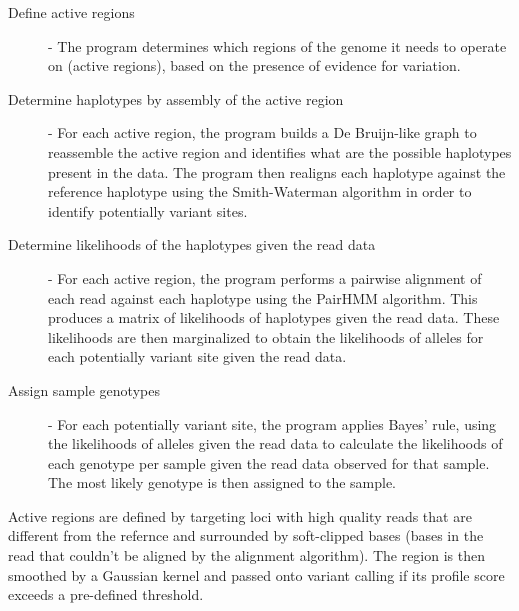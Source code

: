 \begin{description}
    \item [Define active regions] - The program determines which regions of the genome it needs to operate on (active regions), based on the presence of evidence for variation. 
    \item [Determine haplotypes by assembly of the active region] - For each active region, the program builds a De Bruijn-like graph to reassemble the active region and identifies what are the possible haplotypes present in the data. The program then realigns each haplotype against the reference haplotype using the Smith-Waterman algorithm in order to identify potentially variant sites.
    \item [Determine likelihoods of the haplotypes given the read data] - For each active region, the program performs a pairwise alignment of each read against each haplotype using the PairHMM algorithm. This produces a matrix of likelihoods of haplotypes given the read data. These likelihoods are then marginalized to obtain the likelihoods of alleles for each potentially variant site given the read data.
    \item [Assign sample genotypes] - For each potentially variant site, the program applies Bayes' rule, using the likelihoods of alleles given the read data to calculate the likelihoods of each genotype per sample given the read data observed for that sample. The most likely genotype is then assigned to the sample.
\end{description}

Active regions are defined by targeting loci with high quality reads that are different from the refernce and surrounded by soft-clipped bases (bases in the read that couldn't be aligned by the alignment algorithm). The region is then smoothed by a Gaussian kernel and passed onto variant calling if its profile score exceeds a pre-defined threshold. 

